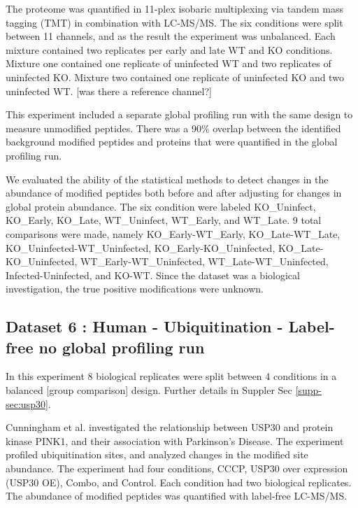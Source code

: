 \documentclass[mcp]{article}
\numberwithin{table}{section}
\def\todo#1{{\color{red}[#1]}}
\begin{document}
The proteome was quantified in 11-plex isobaric multiplexing via tandem mass tagging (TMT) in combination with LC-MS/MS. The six conditions were split between 11 channels, and as the result the experiment was unbalanced. Each mixture contained two replicates per early and late WT and KO conditions. Mixture one contained one replicate of uninfected WT and two replicates of uninfected KO. Mixture two contained one replicate of uninfected KO and two uninfected WT. \todo{was there a reference channel?}

\medskip {} This experiment included a separate global profiling run with the same design to measure unmodified peptides. There was a 90\% overlap between the identified background modified peptides and proteins that were quantified in the global profiling run.

\medskip {} We evaluated the ability of the statistical methods to detect changes in the abundance of modified peptides both before and after adjusting for changes in global protein abundance. The six condition were labeled KO\_Uninfect, KO\_Early, KO\_Late, WT\_Uninfect, WT\_Early, and WT\_Late. 9 total comparisons were made, namely KO\_Early-WT\_Early, KO\_Late-WT\_Late, KO\_Uninfected-WT\_Uninfected, KO\_Early-KO\_Uninfected, KO\_Late-KO\_Uninfected, WT\_Early-WT\_Uninfected, WT\_Late-WT\_Uninfected, Infected-Uninfected, and KO-WT. Since the dataset was a biological investigation, the true positive modifications were unknown.


\subsection*{Dataset 6 : Human - Ubiquitination - Label-free no global profiling run}
\label{sec:exp_proc_dataset6}

In this experiment 8 biological replicates were split between 4 conditions in a balanced \todo{group comparison} design. Further details in Suppler Sec \ref{supp-sec:usp30}.
 
\medskip {} Cunningham et al. \cite{Cunningham2015} investigated the relationship between USP30 and protein kinase PINK1, and their association with Parkinson’s Disease. The experiment profiled ubiquitination sites, and analyzed changes in the modified site abundance. The experiment had four conditions, CCCP, USP30 over expression (USP30 OE), Combo, and Control. Each condition had two biological replicates. The abundance of modified peptides was quantified with label-free LC-MS/MS.
\end{document}
